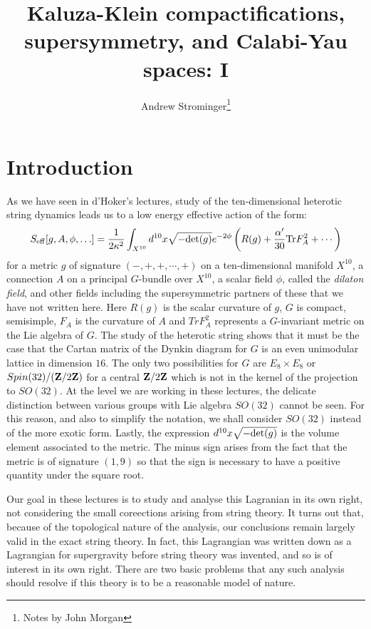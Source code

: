 \title{Kaluza-Klein compactifications, supersymmetry, and Calabi-Yau
spaces: I}  
\author{Andrew Strominger\thanks{Notes by John Morgan}}
\date{}

\maketitle

\section{Introduction}

As we have seen in d'Hoker's lectures,
study of the ten-dimensional 
heterotic string dynamics leads us to a low energy effective action
of the form:
$$S_{\rm eff}[g,A,\phi,\ldots]
=\frac{1}{2\kappa^2}\int_{X^{10}}d^{10}x\sqrt{-{\rm 
det}(g)}e^{-2\phi}\left(R(g)+\frac{\alpha'}{30}{\rm Tr}F_A^2+\cdots\right)$$ 
for a metric $g$ of signature $(-,+,+,\cdots,+)$ on a ten-dimensional
manifold $X^{10}$,  a connection
$A$ on a principal $G$-bundle over $X^{10}$,  a  scalar field
$\phi$, called the {\sl dilaton field}, and other fields including the
supersymmetric partners of these that we have not written here.  Here
$R(g)$ is the  
scalar curvature of $g$, $G$ is compact, semisimple, $F_A$ is the
curvature of $A$ and $Tr F_A^2$ represents a $G$-invariant metric on the
Lie algebra of $G$.  The study of the heterotic string shows
that it must be the case that the Cartan matrix
of the Dynkin diagram for $G$ is an even unimodular lattice in
dimension $16$.  The only two possibilities for $G$ are $E_8\times E_8$
or $Spin(32)/({\bf Z}/2{\bf Z})$ for a central ${\bf Z}/2{\bf Z}$ which
is not in the kernel of the projection to $SO(32)$.
At the level we are working in these lectures, the delicate
distinction between various groups with Lie algebra $SO(32)$ cannot be
seen. 
For this reason, and also to simplify the notation,
we shall consider $SO(32)$ instead of the more exotic form. 
Lastly, the expression $d^{10}x\sqrt{-{\rm det}(g)}$ is the volume
element associated to the metric. The minus sign arises from the fact
that the metric is of signature $(1,9)$ so that the sign is necessary
to have a positive quantity under the square root.

Our goal in these lectures is to study and analyse this Lagranian in
its own right, not considering the small coreections
arising from string theory.
It turns out that, because of the topological nature of the analysis,
our conclusions remain largely valid in the exact string theory. 
In fact, this Lagrangian was written down as a Lagrangian for
supergravity before string theory was  invented, and so is of interest
in its own right.
There are  two basic problems that any such analysis should
resolve if this theory is to be a reasonable model of nature.

